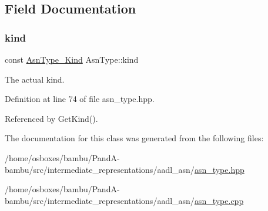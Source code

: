 \subsection{Field Documentation}
\mbox{\label{classAsnType_ad7fc433abd92d41b6ff53ef828482df2}} 
\subsubsection{\texorpdfstring{kind}{kind}}
{\footnotesize\ttfamily const \hyperlink{asn__type_8hpp_a8d6021a223e1d3f16d93cac2f5ab45c3}{Asn\+Type\+\_\+\+Kind} Asn\+Type\+::kind\hspace{0.3cm}{\ttfamily [protected]}}



The actual kind. 



Definition at line 74 of file asn\+\_\+type.\+hpp.



Referenced by Get\+Kind().



The documentation for this class was generated from the following files\+:\begin{DoxyCompactItemize}
\item 
/home/osboxes/bambu/\+Pand\+A-\/bambu/src/intermediate\+\_\+representations/aadl\+\_\+asn/\hyperlink{asn__type_8hpp}{asn\+\_\+type.\+hpp}\item 
/home/osboxes/bambu/\+Pand\+A-\/bambu/src/intermediate\+\_\+representations/aadl\+\_\+asn/\hyperlink{asn__type_8cpp}{asn\+\_\+type.\+cpp}\end{DoxyCompactItemize}
